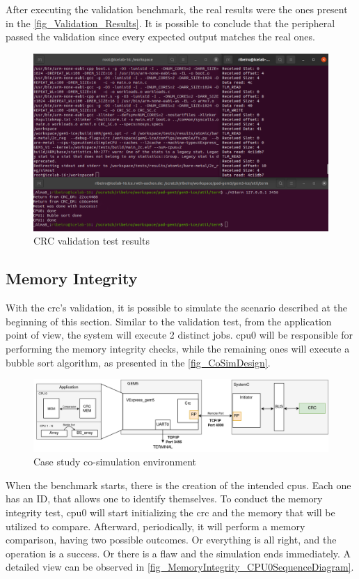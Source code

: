 After executing the validation benchmark, the real results were the ones present in the \autoref{fig_Validation_Results}. It is possible to 
conclude that the peripheral passed the validation since every expected output matches the real ones. 

\begin{figure}[H]
	\centering
 	\includegraphics[width=0.8\linewidth]{Images/Validation_Results.png} 
 	\caption{CRC validation test results}
	\label{fig_Validation_Results}
\end{figure}


\subsection{Memory Integrity}

With the \gls{crc}'s validation, it is possible to simulate the scenario described at the beginning of this section. 
Similar to the validation test, 
from the application point of view, the system will execute 2 distinct jobs. \gls{cpu}0 will be responsible for 
performing the memory integrity checks, while the remaining ones will execute a bubble sort algorithm, as presented in 
the \autoref{fig_CoSimDesign}.

\begin{figure}[H]
	\centering
 	\includegraphics[width=1\linewidth]{Images/CoSimDesign.png}
 	\caption{Case study co-simulation environment}
	 \label{fig_CoSimDesign}
\end{figure}

When the benchmark starts, there is the creation of the intended \glspl{cpu}. Each one has an ID, that allows one to identify
themselves. To conduct the memory integrity test, \gls{cpu}0 will start initializing the \gls{crc} and the memory that will 
be utilized to compare. Afterward, periodically, it will perform a memory comparison, having two possible outcomes. Or everything
is all right, and the operation is a success. Or there is a flaw and the simulation ends immediately. A detailed view can be 
observed in \ref{fig_MemoryIntegrity_CPU0SequenceDiagram}. 

